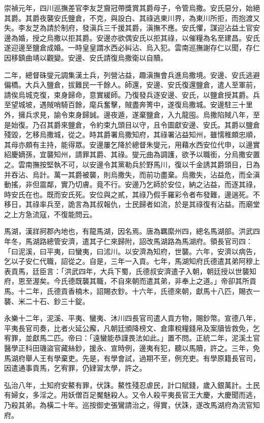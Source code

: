 \begin{pinyinscope}
崇禎元年，四川巡撫差官李友芝齎冠帶獎賞其爵母子，令管烏撒。安氏惡分，始絕其爵。其爵夜襲安氏鹽倉，不克，與設白、其祿逃東川界，為東川所拒，而抱渡又失。李友芝為請於制府，發滇兵三千援其爵，滇撫不應。安氏懼，謀迎沾益土官安邊為婚，授之烏撒以拒其爵。安邊亦欲偶安氏以拒其祿，以催糧為名至建昌。安氏遂迎邊至鹽倉成婚。一時皇皇謂水西必糾沾、烏入犯。雲南巡撫謝存仁以聞，存仁因移鎮曲靖以觀變。安邊、安氏請復烏撒衛以自贖。

二年，總督硃燮元調集漢土兵，列營沾益，趣滇撫會兵進烏撒境。安邊、安氏逃避偏橋。大兵入鹽倉，拔難民一千餘人。師還，安邊、安氏復還鹽倉，遣人至軍前，請俟烏城克復，束身歸命，意實緩師。乃復發兵逐安邊、安氏，以鹽倉授其爵。兵至望城坡，遇賊哨騎百餘，麾兵奮擊，賊盡奔箐中，遂復烏撒城。安邊駐三十里外，擁兵求見，諭令束身歸誠。邊夜遁，遂棄鹽倉，入九龍囤。烏撒陷賊八年，至是始復。乃召其爵來鹽倉，令約束九頭目以守，且令圖獻安邊、安氏。其爵以鹽倉殘毀，乞移烏撒城，從之。時其爵署烏撒知府，其祿署沾益知州，雖懦稚頗忠順，其母亦頗有主持，能得眾。安邊屢乞降於總督朱燮元，用藉水西安位代申，以邊實紹慶嫡孫，宜襲知州，請罪其爵、其祿。燮元曲為調護，欲予以職銜，分烏撒安置之。雲南撫按堅執不可，以安邊令其黨勒兵於野馬川，復以千金誘其爵頭目，日為并吞沾、烏計。萬一其爵被襲，則烏撒失，而前功盡棄。烏撒失，沾益危，而全滇動搖，非但震鄰，實乃切膚。竟不行。安邊乃乞師於安位，納之沾益，而逐其祿，時安氏在也。既而安氏死。安位與之貳，其祿乃假手羅彩令者布發難，邊遄死。不移日，其祿率兵至，詭言為其叔報仇，士民歸者如流，於是其祿復有沾益。而廟堂之上方急流寇，不復能問云。

馬湖，漢牂牁郡內地也，有龍馬湖，因名焉。唐為羈縻州四，總名馬湖部。洪武四年冬，馬湖路總管安濟，遣其子仁來歸附，詔改馬湖路為馬湖府。領長官司四：「曰泥溪，曰平夷，曰蠻夷，曰沭川。以安濟為知府，世襲。六年，安濟以病告，乞以子安仁代職，詔從之。自是，三年一入貢。七年，馬湖知府氏德遣其弟阿穆上表貢馬，廷臣言：「洪武四年，大兵下蜀，氏德叔安濟遣子入朝，朝廷授以世襲知府，恩至渥矣。今氏德既襲其職，不自來朝而遣其弟，非奉上之道。」帝卻其所貢馬。十二年，氏德貢香楠木，詔賜衣鈔。十六年，氏德來朝，獻馬十八匹，賜衣一襲、米二十石、鈔三十錠。

永樂十二年，泥溪、平夷、蠻夷、沐川四長官司遣人貢方物，賜鈔幣。宣德八年，平夷長官司奏，比者火延公廨，凡朝廷頒降榜文、倉庫稅糧錢帛及案牘皆救免，乞宥罪，並獻馬二匹。帝曰：「遠蠻能恭謹畏法如此。」置不問。正統二年，泥溪土官醫學正科田璣盜官藏絲鈔，援永、宣時例，邊夷有犯，聽以馬贖，許之。三年，免馬湖府舉人王有學棄吏。先是，有學會試，過期不至，例充吏。有學原籍長官司，因遣通事貢馬，乞宥罪，仍肄習太學，許之。

弘治八年，土知府安鰲有罪，伏誅。鰲性殘忍虐民，計口賦錢，歲入銀萬計。土民有婦女，多淫之。用妖僧百足魘魅殺人。又令人殺平夷長官王大慶，大慶聞而逃，乃殺其弟。為橫二十年。巡按御史張鸞請治之，得實，伏誅，遂改馬湖府為流官知府。


\end{pinyinscope}
